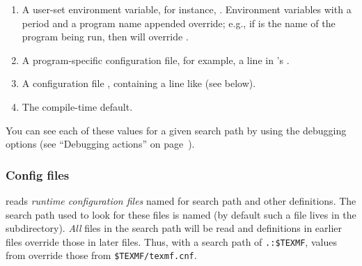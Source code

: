 \documentclass{article}
\begin{document}
\begin{enumerate}
\item 
  A user-set environment variable, for instance, \@.
  Environment variables with a period and a program name appended
  override; e.g., if  is the name of the program being run,
  then  will override .
\item 
  A program-specific configuration file, for exam\-ple, a line
   in 's .
\item   A \KPS{} configuration file , containing a line like
   (see below).  
\item The compile-time default.
\end{enumerate} 
\noindent You can see each of these values for a given
search path by using the debugging options (see ``Debugging actions''
on page~\pageref{Debugging}).

\subsubsection{Config files}

\begingroup{}
\KPS{} reads \emph{runtime configuration files} named 
for search path and other definitions.  The search path used to look
for these files is named  (by default such a file lives
in the  subdirectory).  \emph{All}
 files in the search path will be read and definitions
in earlier files override those in later files.  Thus, with a search
path of \verb|.:$TEXMF|, values from  override those
from \verb|$TEXMF/texmf.cnf|.
\endgroup
\end{document}

